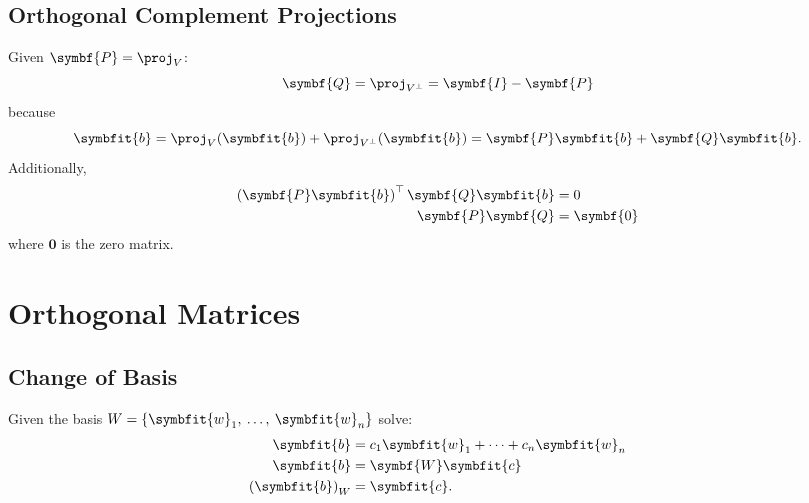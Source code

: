 \documentclass{article}
\begin{document}
\begin{multicols*}{3}
    \subsection{Orthogonal Complement Projections}
    Given \(\symbf{P} = \proj_V\):
    \begin{equation*}
        \symbf{Q} = \proj_{V^\perp} = \symbf{I} - \symbf{P}
    \end{equation*}
    because
    \begin{equation*}
        \symbfit{b} = \proj_V(\symbfit{b}) + \proj_{V^\perp}(\symbfit{b}) = \symbf{P}\symbfit{b} + \symbf{Q}\symbfit{b}.
    \end{equation*}
    Additionally,
    \begin{align*}
        \left( \symbf{P}\symbfit{b} \right)^\top \symbf{Q}\symbfit{b} & = 0         \\
        \symbf{P} \symbf{Q}                                           & = \symbf{0}
    \end{align*}
    where \(\symbf{0}\) is the zero matrix.
    \section{Orthogonal Matrices}
    \subsection{Change of Basis}
    Given the basis \(W = \left\{ \symbfit{w}_1,\: \dots,\: \symbfit{w}_n \right\}\)
    solve:
    \begin{align*}
        \symbfit{b}                  & = c_1 \symbfit{w}_1 + \cdots + c_n \symbfit{w}_n \\
        \symbfit{b}                  & = \symbf{W} \symbfit{c}                          \\
        \left( \symbfit{b} \right)_W & = \symbfit{c}.
    \end{align*}

\end{multicols*}
\end{document}
